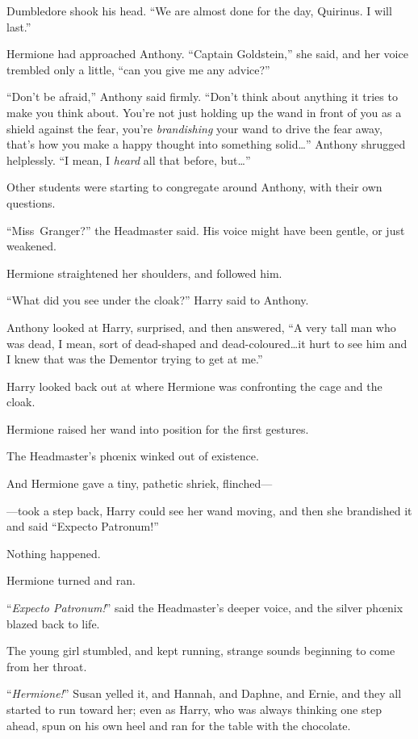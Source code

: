 Dumbledore shook his head. “We are almost done for the day, Quirinus. I will last.”

Hermione had approached Anthony. “Captain Goldstein,” she said, and her voice trembled only a little, “can you give me any advice?”

“Don’t be afraid,” Anthony said firmly. “Don’t think about anything it tries to make you think about. You’re not just holding up the wand in front of you as a shield against the fear, you’re \emph{brandishing} your wand to drive the fear away, that’s how you make a happy thought into something solid…” Anthony shrugged helplessly. “I mean, I \emph{heard} all that before, but…”

Other students were starting to congregate around Anthony, with their own questions.

“Miss~Granger?” the Headmaster said. His voice might have been gentle, or just weakened.

Hermione straightened her shoulders, and followed him.

“What did you see under the cloak?” Harry said to Anthony.

Anthony looked at Harry, surprised, and then answered, “A very tall man who was dead, I mean, sort of dead-shaped and dead-coloured…it hurt to see him and I knew that was the Dementor trying to get at me.”

Harry looked back out at where Hermione was confronting the cage and the cloak.

Hermione raised her wand into position for the first gestures.

The Headmaster’s phœnix winked out of existence.

And Hermione gave a tiny, pathetic shriek, flinched—

—took a step back, Harry could see her wand moving, and then she brandished it and said “Expecto Patronum!”

Nothing happened.

Hermione turned and ran.

“\emph{Expecto Patronum!}” said the Headmaster’s deeper voice, and the silver phœnix blazed back to life.

The young girl stumbled, and kept running, strange sounds beginning to come from her throat.

“\emph{Hermione!}” Susan yelled it, and Hannah, and Daphne, and Ernie, and they all started to run toward her; even as Harry, who was always thinking one step ahead, spun on his own heel and ran for the table with the chocolate.

